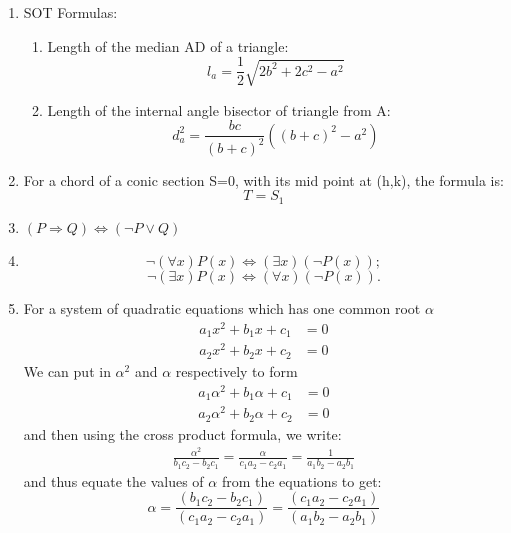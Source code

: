 \documentclass{article}
\numberwithin{equation}{section}
\numberwithin{figure}{section}
\begin{document}
\begin{enumerate}
		\item SOT Formulas:
		\begin{enumerate}
			\item Length of the median AD of a triangle:
				\begin{equation}
					l_{a}=\frac{1}{2}\sqrt{2b^2+2c^2-a^2}
				\end{equation}
			\item Length of the internal angle bisector of triangle from A:
				\begin{equation}
					d^2_{a}=\frac{bc}{(b+c)^2}\left((b+c)^2-a^2\right)
				\end{equation}
		\end{enumerate}
		\item For a chord of a conic section S=0, with its mid point at (h,k), the formula is:
			\begin{equation}
				T=S_1
			\end{equation}
		\item $(P\Rightarrow Q)\Leftrightarrow(\neg P \vee Q)$
		\item \begin{equation}
				  \neg (\forall x) P(x) \Leftrightarrow (\exists x)(\neg P(x));
			\end{equation}
			  \begin{equation}
				    \neg (\exists x) P(x) \Leftrightarrow (\forall x)(\neg P(x)).
			  \end{equation}
		\item For a system of quadratic equations which has one common root $\alpha$
			\begin{align}
				a_1 x^2 + b_1 x + c_1 &=0\\
				a_2 x^2 + b_2 x + c_2 &=0
			\end{align}
			We can put in $\alpha^2$ and $\alpha$ respectively to form
			\begin{align}
				a_1 \alpha^2 + b_1 \alpha + c_1 &=0\\
				a_2 \alpha^2 + b_2 \alpha + c_2 &=0
			\end{align}
			and then using the cross product formula, we write:
			\begin{align}
				\frac{\alpha^2}{b_1 c_2-b_2 c_1}=\frac{\alpha}{c_1 a_2-c_2 a_1}=\frac{1}{a_1 b_2 - a_2 b_1}
			\end{align}
			and thus equate the values of $\alpha$ from the equations to get:
			\begin{equation}
				\alpha=\frac{(b_1 c_2 - b_2 c_1)}{(c_1 a_2 - c_2 a_1)}=\frac{(c_1 a_2 - c_2 a_1)}{(a_1 b_2 - a_2 b_1)}

\end{equation}
\end{enumerate}
\end{document}
